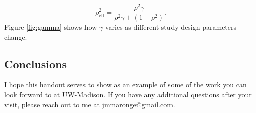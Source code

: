 \documentclass[12pt]{article}
\begin{document}
\begin{multicols}{2}
\begin{equation} \label{eq:rhoeff}
\rho^2_{\mbox{eff}} =\frac{\rho^2\gamma}{\rho^2\gamma+(1-\rho^2)}.
\end{equation}
\noindent Figure \ref{fig:gamma} shows how $\gamma$ varies as different study design parameters change.

\subsection*{Conclusions}
I hope this handout serves to show as an example of some of the work you can look forward to at UW-Madison. If you have any additional questions after your visit, please reach out to me at jmmaronge@gmail.com.
\end{multicols}
\end{document}
